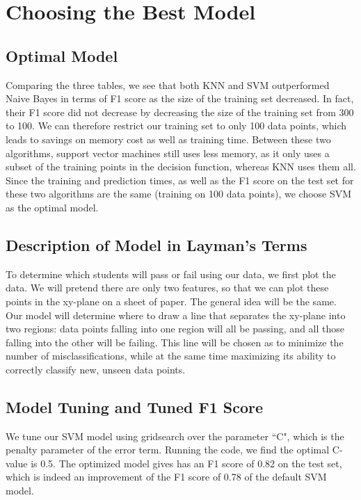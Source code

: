 \documentclass[12 pt]{article}
\numberwithin{equation}{section}
\begin{document}
\section{Choosing the Best Model}
\subsection{Optimal Model}
Comparing the three tables, we see that both KNN and SVM outperformed Naive Bayes in terms of F1 score as the size of the training set decreased. In fact, their F1 score did not decrease by decreasing the size of the training set from 300 to 100. We can therefore restrict our training set to only 100 data points, which leads to savings on memory cost as well as training time. Between these two algorithms, support vector machines still uses less memory, as it only uses a subset of the training points in the decision function, whereas KNN uses them all. Since the training and prediction times, as well as the F1 score on the test set for these two algorithms are the same (training on 100 data points), we choose SVM as the optimal model.
\subsection{Description of Model in Layman's Terms}
To determine which students will pass or fail using our data, we first plot the data. We will pretend there are only two features, so that we can plot these points in the xy-plane on a sheet of paper. The general idea will be the same. Our model will determine where to draw a line that separates the xy-plane into two regions: data points falling into one region will all be passing, and all those falling into the other will be failing. This line will be chosen as to minimize the number of misclassifications, while at the same time maximizing its ability to correctly classify new, unseen data points.

\subsection{Model Tuning and Tuned F1 Score}
We tune our SVM model using gridsearch over the parameter ``C", which is the penalty parameter of the error term. Running the code, we find the optimal C-value is 0.5. The optimized model gives has an F1 score of 0.82 on the test set, which is indeed an improvement of the F1 score of 0.78 of the default SVM model.
\end{document}
